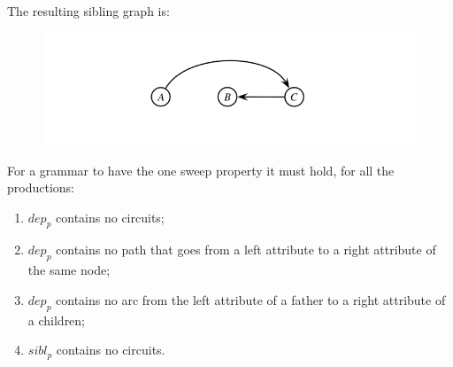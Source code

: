 					The resulting sibling graph is:
					\begin{figure}[H]
						\centering
						\includegraphics[width = \textwidth]{./images/sibling.png}
					\end{figure}
					For a grammar to have the one sweep property it must hold, for all the productions:
					\begin{enumerate}
						\item $dep_p$ contains no circuits;
						\item $dep_p$ contains no path that goes from a left attribute to a right attribute of the same node;
						\item $dep_p$ contains no arc from the left attribute of a father to a right attribute of a children;
						\item $sibl_p$ contains no circuits. 
					\end{enumerate}
			
